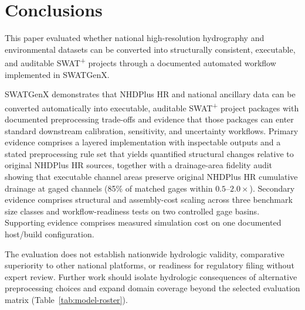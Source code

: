 \section{Conclusions}

This paper evaluated whether national high-resolution hydrography and environmental datasets can be converted into structurally consistent, executable, and auditable SWAT\textsuperscript{+} projects through a documented automated workflow implemented in SWATGenX.

SWATGenX demonstrates that NHDPlus HR and national ancillary data can be converted automatically into executable, auditable SWAT\textsuperscript{+} project packages with documented preprocessing trade-offs and evidence that those packages can enter standard downstream calibration, sensitivity, and uncertainty workflows.
Primary evidence comprises a layered implementation with inspectable outputs and a stated preprocessing rule set that yields quantified structural changes relative to original NHDPlus HR sources, together with a drainage-area fidelity audit showing that executable channel areas preserve original NHDPlus HR cumulative drainage at gaged channels (85\% of matched gages within $0.5$--$2.0\times$).
Secondary evidence comprises structural and assembly-cost scaling across three benchmark size classes and workflow-readiness tests on two controlled gage basins.
Supporting evidence comprises measured simulation cost on one documented host/build configuration.

The evaluation does not establish nationwide hydrologic validity, comparative superiority to other national platforms, or readiness for regulatory filing without expert review.
Further work should isolate hydrologic consequences of alternative preprocessing choices and expand domain coverage beyond the selected evaluation matrix (Table~\ref{tab:model-roster}).
